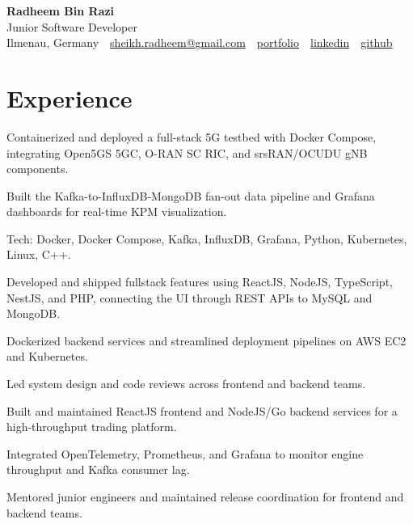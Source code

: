 \documentclass[10pt,a4paper]{resume}
\makeatletter
\newcommand{\Portfolio}{https://radheem.github.io/my-cv}
\newcommand{\PortfolioText}{portfolio}
\newcommand{\GitHub}{https://github.com/radheem}
\newcommand{\LinkedIn}{https://www.linkedin.com/in/radheem-razi}
\newcommand{\Email}{sheikh.radheem@gmail.com}
\makeatother
\begin{document}
\begin{center}
  {\huge\bfseries Radheem Bin Razi}\\[3pt]
  {\large Junior Software Developer}\\[6pt]
  \small
  Ilmenau, Germany \,\textbar\,
  \href{mailto:\Email}{\Email} \,\textbar\,
  \href{\Portfolio}{\PortfolioText} \,\textbar\,
  \href{\LinkedIn}{linkedin} \,\textbar\,
  \href{\GitHub}{github}
\end{center}
\vspace{2pt}

\section{Experience}

\bullets
  \item Containerized and deployed a full-stack 5G testbed with Docker Compose, integrating Open5GS 5GC, O-RAN SC RIC, and srsRAN/OCUDU gNB components.
  \item Built the Kafka-to-InfluxDB-MongoDB fan-out data pipeline and Grafana dashboards for real-time KPM visualization.
  \item Tech: Docker, Docker Compose, Kafka, InfluxDB, Grafana, Python, Kubernetes, Linux, C++.
\bulletsend
\vspace{1.5pt}
\bullets
  \item Developed and shipped fullstack features using ReactJS, NodeJS, TypeScript, NestJS, and PHP, connecting the UI through REST APIs to MySQL and MongoDB.
  \item Dockerized backend services and streamlined deployment pipelines on AWS EC2 and Kubernetes.
  \item Led system design and code reviews across frontend and backend teams.
\bulletsend
\vspace{1.5pt}
\bullets
  \item Built and maintained ReactJS frontend and NodeJS/Go backend services for a high-throughput trading platform.
  \item Integrated OpenTelemetry, Prometheus, and Grafana to monitor engine throughput and Kafka consumer lag.
  \item Mentored junior engineers and maintained release coordination for frontend and backend teams.
\bulletsend
\vspace{1.5pt}
\end{document}
